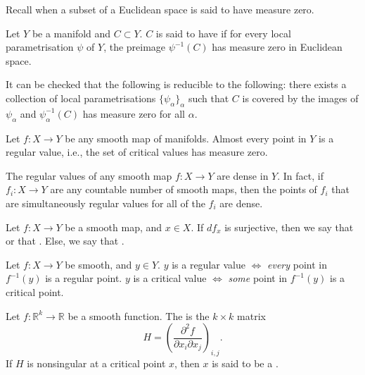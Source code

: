 Recall when a subset of a Euclidean space is said to have measure zero.

\begin{defn}
	Let $Y$ be a manifold and $C \subset Y$. $C$ is said to have  if for every local parametrisation $\psi$ of $Y$, the preimage $\psi^{-1}(C)$ has measure zero in Euclidean space.
\end{defn}

It can be checked that the following is reducible to the following: there exists a collection of local parametrisations $\{\psi_{\alpha}\}_{\alpha}$ such that $C$ is covered by the images of $\psi_{\alpha}$ and $\psi_{\alpha}^{-1}(C)$ has measure zero for all $\alpha$.

\begin{thm}
	Let $f : X \to Y$ be any smooth map of manifolds. \newline
	Almost every point in $Y$ is a regular value, i.e., the set of critical values has measure zero.
\end{thm}

\begin{cor}
	The regular values of any smooth map $f : X \to Y$ are dense in $Y$. In fact, if $f_{i} : X \to Y$ are any countable number of smooth maps, then the points of $f_{i}$ that are simultaneously regular values for all of the $f_{i}$ are dense.
\end{cor}

\begin{defn}
	Let $f : X \to Y$ be a smooth map, and $x \in X$. \newline
	If $df_{x}$ is surjective, then we say that  or that . Else, we say that .
\end{defn}

\begin{rem}
	Let $f : X \to Y$ be smooth, and $y \in Y$. \newline
	$y$ is a regular value $\Leftrightarrow$ \emph{every} point in $f^{-1}(y)$ is a regular point. \newline
	$y$ is a critical value $\Leftrightarrow$ \emph{some} point in $f^{-1}(y)$ is a critical point. 
\end{rem}

\begin{defn}
	Let $f : \mathbb{R}^{k} \to \mathbb{R}$ be a smooth function. The  is the $k \times k$ matrix
	\begin{equation*} 
		H = \left(\frac{\partial^{2} f}{\partial x_{i} \partial x_{j}}\right)_{i, j}.
	\end{equation*}
	If $H$ is nonsingular at a critical point $x$, then $x$ is said to be a .
\end{defn}

